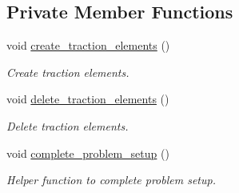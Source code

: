 \subsection*{Private Member Functions}
\begin{DoxyCompactItemize}
\item 
void \hyperlink{classRingWithTRibProblem_ac4445c7a9fbfdcb69063d36fe0fe08c3}{create\+\_\+traction\+\_\+elements} ()
\begin{DoxyCompactList}\small\item\em Create traction elements. \end{DoxyCompactList}\item 
void \hyperlink{classRingWithTRibProblem_aa85169a96623cb39f18111ee436f5b9d}{delete\+\_\+traction\+\_\+elements} ()
\begin{DoxyCompactList}\small\item\em Delete traction elements. \end{DoxyCompactList}\item 
void \hyperlink{classRingWithTRibProblem_a7aa8c978ec6ff0a9823ef895b263fb41}{complete\+\_\+problem\+\_\+setup} ()
\begin{DoxyCompactList}\small\item\em Helper function to complete problem setup. \end{DoxyCompactList}\end{DoxyCompactItemize}

